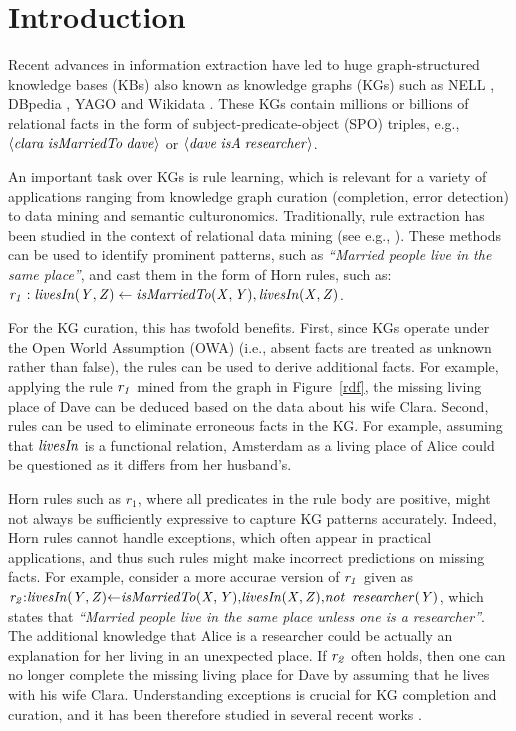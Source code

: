 \section{Introduction}
\label{sec:intro}

Recent advances in information extraction have led to
huge graph-structured knowledge bases (KBs) also known as knowledge graphs (KGs) such as NELL \cite{nell}, DBpedia \cite{dbpedia}, YAGO \cite{yago} and Wikidata \cite{wikidata}. These KGs contain millions or billions of relational facts in the form of subject-predicate-object (SPO) triples, e.g., $\langle\mathit{clara\;isMarriedTo\;dave}\rangle$ or $\langle\mathit{dave\;isA\;researcher}\rangle$. 

An important task over KGs is rule learning, which is relevant for a variety of applications ranging from knowledge graph curation (completion, error detection) \cite{DBLP:journals/semweb/Paulheim17} to data mining and semantic culturonomics. 
Traditionally, rule extraction has been studied in the context of relational data mining (see e.g., \cite{amie,op,rdf2rules}). These methods can be used to identify prominent patterns, such as \emph{``Married people live in the same
place''}, and cast them in the form of Horn rules, such as:
$\mathit{r_1:\;}\mathit{livesIn(Y,Z)}\leftarrow \mathit{isMarriedTo(X,Y),livesIn(X,Z)}$.

For the KG curation, this has twofold benefits. First, since KGs operate under the Open World
Assumption (OWA) (i.e., absent facts are treated as unknown rather than false),
the rules can be used to derive additional facts. For example, applying the rule
$\mathit{r_1}$ mined from the graph in Figure~\ref{rdf}, the missing living place of Dave can be deduced based on the data about his wife Clara. Second, rules can be used to eliminate erroneous facts in the KG. For example, assuming
that $\mathit{livesIn}$ is a functional relation, Amsterdam as a living place of
Alice could be questioned as it differs from her husband's.

Horn rules such as $r_1$, where all predicates in the rule body are positive,  might not always be sufficiently expressive %
to capture KG patterns accurately. Indeed, Horn rules cannot handle exceptions, which often appear in practical applications, and thus such rules might make incorrect predictions on missing facts.
For example, consider a more accurae version of $\mathit{r_1}$ given as \\$\mathit{r_2{:}livesIn(Y,Z){\leftarrow}
  isMarriedTo(X,Y){,}livesIn(X,Z){,}{\mathit{not}~ \,} researcher(Y)}$, which \\states that \emph{``Married people live in the same place unless one is a
  researcher''}. The additional knowledge that Alice is a researcher could be actually an explanation for her living in an unexpected place. If $\mathit{r_2}$ often holds, then
one can no longer complete the missing living place for Dave by assuming that he lives with his wife Clara. 
Understanding exceptions is crucial for KG completion and curation, and it has been therefore studied in several recent works \cite{DBLP:conf/semweb/Gad-ElrabSUW16,rumis}.

